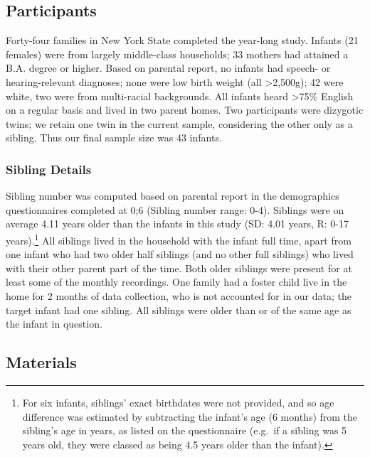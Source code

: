 \documentclass[
  man,mask,floatsintext]{apa6}
\begin{document}
\hypertarget{participants}{%
\subsection{Participants}\label{participants}}

Forty-four families in New York State completed the year-long study. Infants (21 females) were from largely middle-class households; 33 mothers had attained a B.A. degree or higher. Based on parental report, no infants had speech- or hearing-relevant diagnoses; none were low birth weight (all \textgreater2,500g); 42 were white, two were from multi-racial backgrounds. All infants heard \textgreater75\% English on a regular basis and lived in two parent homes. Two participants were dizygotic twins; we retain one twin in the current sample, considering the other only as a sibling. Thus our final sample size was 43 infants.

\hypertarget{sibling-details}{%
\subsubsection{Sibling Details}\label{sibling-details}}

Sibling number was computed based on parental report in the demographics questionnaires completed at 0;6 (Sibling number range: 0-4). Siblings were on average 4.11 years older than the infants in this study (SD: 4.01 years, R: 0-17 years).\footnote{For six infants, siblings' exact birthdates were not provided, and so age difference was estimated by subtracting the infant's age (6 months) from the sibling's age in years, as listed on the questionnaire (e.g.~if a sibling was 5 years old, they were classed as being 4.5 years older than the infant).} All siblings lived in the household with the infant full time, apart from one infant who had two older half siblings (and no other full siblings) who lived with their other parent part of the time. Both older siblings were present for at least some of the monthly recordings. One family had a foster child live in the home for 2 months of data collection, who is not accounted for in our data; the target infant had one sibling. All siblings were older than or of the same age as the infant in question.

\hypertarget{materials}{%
\subsection{Materials}\label{materials}}
\end{document}
